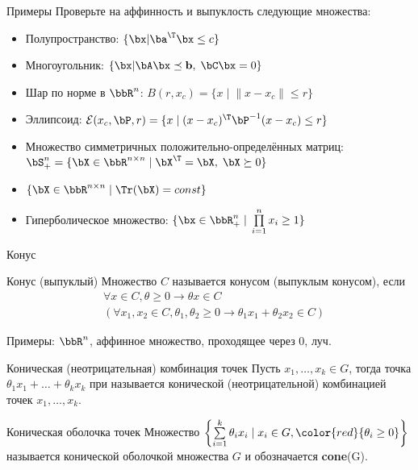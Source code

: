 \documentclass[12pt,russian]{beamer}
\begin{document}
\begin{frame}{Примеры}
Проверьте на аффинность и выпуклость следующие множества:
\begin{itemize}
\item Полупространство: $\{ \bx | \ba^{\T} \bx \leq c \}$
\item Многоугольник: $\{ \bx | \bA\bx \preceq \mathbf{b}, \; \bC\bx = 0 \}$
\item Шар по норме в $\bbR^n$: $B(r, x_c) = \{ x \; | \; \| x - x_c \| \leq r \}$
\item Эллипсоид: $\mathcal{E}(x_c, \bP, r) = \{ x \; | \; (x - x_c)^{\T}\bP^{-1} (x - x_c) \leq r \}$
\item Множество симметричных положительно-определённых матриц: $\bS^n_+ = \{ \bX \in \bbR^{n \times n} \; | \; \bX^{\T} = \bX, \; \bX \succeq 0 \}$
\item $\{ \bX \in \bbR^{n \times n} \; | \; \Tr(\bX) = const \}$
\item Гиперболическое множество: $\{ \bx \in \bbR^n_+ \; | \; \prod\limits_{i=1}^n x_i \geq 1 \}$
\end{itemize}
\end{frame}

\begin{frame}{Конус}
\small
\begin{block}{Конус (выпуклый)}
Множество $C$ называется конусом (выпуклым конусом), если 
\vspace{-4mm}
\begin{equation*}
\begin{split}
& \forall x \in C, \theta \geq 0 \rightarrow \theta x \in C \\
& (\forall x_1, x_2 \in C, \theta_1, \theta_2 \geq 0 \rightarrow \theta_1 x_1 + \theta_2 x_2 \in C)
\end{split}
\end{equation*}
\vspace{-4mm}
\end{block}
Примеры: $\bbR^n$, аффинное множество, проходящее через 0, луч.
\begin{block}{Коническая (неотрицательная) комбинация точек}
Пусть $x_1, \ldots, x_k \in G$, тогда точка $\theta_1 x_1 + \ldots + \theta_k x_k$ при {\color{red}{$\theta_i \geq 0$}} называется конической (неотрицательной) комбинацией точек $x_1,\ldots,x_k$.
\end{block}

\begin{block}{Коническая оболочка точек}
Множество $\left\{ \sum\limits_{i=1}^k \theta_i x_i \; | \; x_i \in G, {\color{red}{\theta_i \geq 0}} \right\}$ называется конической оболочкой множества $G$ и обозначается \textbf{cone}(G).
\end{block}
\end{frame}
\end{document}
